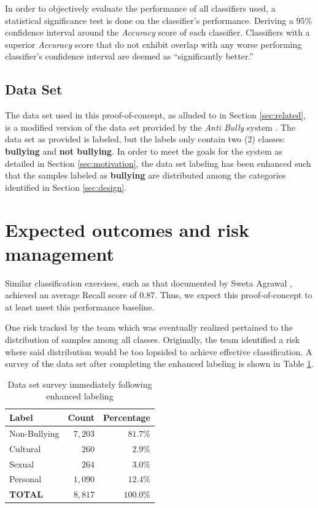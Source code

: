 \documentclass[conference]{sig-alternate-05-2015}
\begin{document}
In order to objectively evaluate the performance of all classifiers used, a
statistical significance test is done on the classifier's performance. Deriving
a $95$\% confidence interval around the \textit{Accuracy} score of each
classifier. Classifiers with a superior \textit{Accuracy} score that do not
exhibit overlap with any worse performing classifier's confidence interval are
deemed as ``significantly better.''

\subsection{Data Set}\label{sec:dataset}
The data set used in this proof-of-concept, as alluded to in Section
\ref{sec:related}, is a modified version of the data set provided by the
\textit{Anti Bully} system \cite{Li2016}. The data set as provided is labeled,
but the labels only contain two (2) classes: \textbf{bullying} and
\textbf{not bullying}. In order to meet the goals for the system as detailed in
Section \ref{sec:motivation}, the data set labeling has been
enhanced such that the samples labeled as \textbf{bullying} are distributed
among the categories identified in Section \ref{sec:design}.

\section{Expected outcomes and risk management}\label{sec:expectations}

Similar classification exercises, such as that documented by Sweta Agrawal
\cite{agrawal2018deep}, achieved an average Recall score of \( 0.87 \). Thus,
we expect this proof-of-concept to at least meet this performance baseline.

One risk tracked by the team which was eventually realized pertained to the
distribution of samples among all classes. Originally, the team identified a
risk where said distribution would be too lopsided to achieve effective
classification. A survey of the data set after completing the enhanced labeling
is shown in Table \ref{tab:dataset_survey_first}.

\begin{table}[h!]
  \centering
  \begin{tabular}{| l | r | r |}
    \hline
    Label & Count & Percentage \\
    \hline\hline
    Non-Bullying & $7,203$ & $81.7$\% \\
    \hline
    Cultural & $260$ & $2.9$\% \\
    \hline
    Sexual & $264$ & $3.0$\% \\
    \hline
    Personal & $1,090$ & $12.4$\% \\
    \hline\hline
    \textbf{TOTAL} & $8,817$ & $100.0$\% \\
    \hline
  \end{tabular}
  \caption{Data set survey immediately following enhanced labeling}
  \label{tab:dataset_survey_first}
\end{table}
\end{document}
